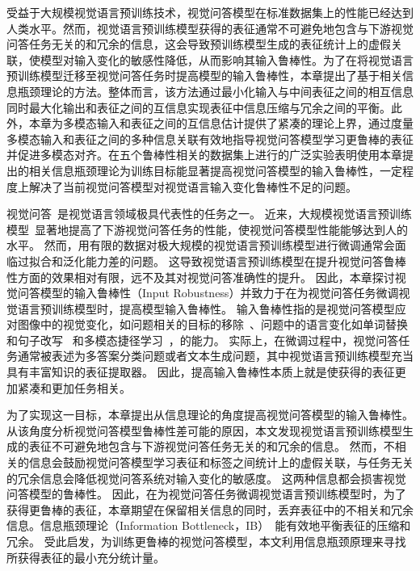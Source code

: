 

受益于大规模视觉语言预训练技术，视觉问答模型在标准数据集上的性能已经达到人类水平。然而，视觉语言预训练模型获得的表征通常不可避免地包含与下游视觉问答任务无关的和冗余的信息，这会导致预训练模型生成的表征统计上的虚假关联，使模型对输入变化的敏感性降低，从而影响其输入鲁棒性。为了在将视觉语言预训练模型迁移至视觉问答任务时提高模型的输入鲁棒性，本章提出了基于相关信息瓶颈理论的方法。整体而言，该方法通过最小化输入与中间表征之间的相互信息同时最大化输出和表征之间的互信息实现表征中信息压缩与冗余之间的平衡。此外，本章为多模态输入和表征之间的互信息估计提供了紧凑的理论上界，通过度量多模态输入和表征之间的多种信息关联有效地指导视觉问答模型学习更鲁棒的表征并促进多模态对齐。在五个鲁棒性相关的数据集上进行的广泛实验表明使用本章提出的相关信息瓶颈理论为训练目标能显著提高视觉问答模型的输入鲁棒性，一定程度上解决了当前视觉问答模型对视觉语言输入变化鲁棒性不足的问题。



视觉问答~\cite{antol2015vqa}是视觉语言领域极具代表性的任务之一。
近来，大规模视觉语言预训练模型~\cite{wang2021simvlm,wang2021vlmo,li2022blip}显著地提高了下游视觉问答任务的性能，使视觉问答模型性能能够达到人的水平。
然而，用有限的数据对极大规模的视觉语言预训练模型进行微调通常会面临过拟合和泛化能力差的问题。
这导致视觉语言预训练模型在提升视觉问答鲁棒性方面的效果相对有限，远不及其对视觉问答准确性的提升。
因此，本章探讨视觉问答模型的输入鲁棒性（Input Robustness）并致力于在为视觉问答任务微调视觉语言预训练模型时，提高模型输入鲁棒性。
输入鲁棒性指的是视觉问答模型应对图像中的视觉变化，如问题相关的目标的移除~\cite{agarwal2020towards}、问题中的语言变化如单词替换和句子改写~\cite{shah2019cycle,whitehead2020learning} 和多模态捷径学习~\cite{dancette2021beyond}，的能力。
实际上，在微调过程中，视觉问答任务通常被表述为多答案分类问题或者文本生成问题，其中视觉语言预训练模型充当具有丰富知识的表征提取器。
因此，提高输入鲁棒性本质上就是使获得的表征更加紧凑和更加任务相关。


为了实现这一目标，本章提出从信息理论的角度提高视觉问答模型的输入鲁棒性。
从该角度分析视觉问答模型鲁棒性差可能的原因，本文发现视觉语言预训练模型生成的表征不可避免地包含与下游视觉问答任务无关的和冗余的信息。
然而，不相关的信息会鼓励视觉问答模型学习表征和标签之间统计上的虚假关联，与任务无关的冗余信息会降低视觉问答系统对输入变化的敏感度。
这两种信息都会损害视觉问答模型的鲁棒性。
因此，在为视觉问答任务微调视觉语言预训练模型时，为了获得更鲁棒的表征，本章期望在保留相关信息的同时，丢弃表征中的不相关和冗余信息。信息瓶颈理论（Information Bottleneck，IB）~\cite{tishby2000information}能有效地平衡表征的压缩和冗余。
受此启发，为训练更鲁棒的视觉问答模型，本文利用信息瓶颈原理来寻找所获得表征的最小充分统计量。


